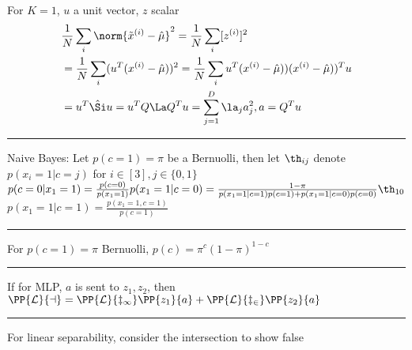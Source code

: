 \documentclass[10pt]{CheatSheet/hw}
\begin{document}
\begin{multicols*}{5}
For $K=1$, $u$ a unit vector, $z$ scalar
\begin{align*}
    &\frac1N\sum_i\norm{\tilde{x}^{(i)}-\hat{\mu}}^2=\frac1N\sum_i[z^{(i)}]^2\\
    &=\frac1N\sum_i(u^T(x^{(i)}-\hat{\mu}))^2=\frac1N\sum_i u^T(x^{(i)}-\hat{\mu}))(x^{(i)}-\hat{\mu}))^T u\\
    &= u^T \hat{\Si}u=u^TQ\La Q^T u=\sum_{j=1}^D \la_j a_j^2, a=Q^T u
\end{align*}
\rule{\linewidth}{0.4pt}
Naive Bayes: Let $p(c=1)=\pi$ be a Bernuolli, then let $\th_{ij}$ denote $p(x_i=1|c=j)$ for $i\in[3], j\in\{0,1\}$\\
$p(c=0|x_1=1)=\frac{p(c=0)}{p(x_1=1)}p(x_1=1|c=0)=\frac{1-\pi}{p(x_1=1|c=1)p(c=1)+p(x_1=1|c=0)p(c=0)}\th_{10}$\\
$p(x_1=1|c=1)=\frac{p(x_1=1,c=1)}{p(c=1)}$\\
\rule{\linewidth}{0.4pt}
For $p(c=1)=\pi$ Bernuolli, $p(c)=\pi^c(1-\pi)^{1-c}$\\
\rule{\linewidth}{0.4pt}
If for MLP, $a$ is sent to $z_1,z_2$, then $\PP{\cal{L}}{a}=\PP{\cal{L}}{z_1}\PP{z_1}{a}+\PP{\cal{L}}{z_2}\PP{z_2}{a}$\\
\rule{\linewidth}{0.4pt}
For linear separability, consider the intersection to show false\\
\end{multicols*}
\end{document}
